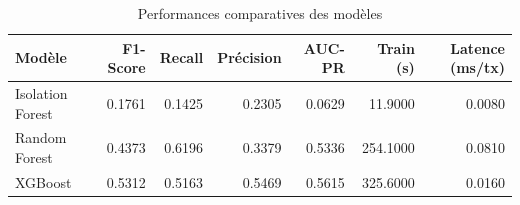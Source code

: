 \begin{table}
\caption{Performances comparatives des modèles}
\label{tab:benchmark}
\begin{tabular}{lrrrrrr}
\toprule
Modèle & F1-Score & Recall & Précision & AUC-PR & Train (s) & Latence (ms/tx) \\
\midrule
Isolation Forest & 0.1761 & 0.1425 & 0.2305 & 0.0629 & 11.9000 & 0.0080 \\
Random Forest & 0.4373 & 0.6196 & 0.3379 & 0.5336 & 254.1000 & 0.0810 \\
XGBoost & 0.5312 & 0.5163 & 0.5469 & 0.5615 & 325.6000 & 0.0160 \\
\bottomrule
\end{tabular}
\end{table}
